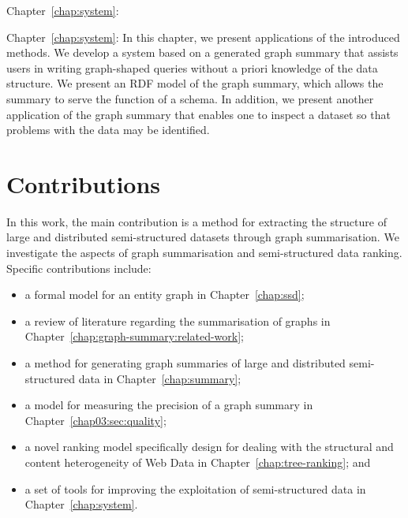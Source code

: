 
\begin{labeling}{Chapter~\ref{chap:system}:}
\item[Chapter~\ref{chap:system}:] In this chapter, we present applications of the introduced methods. We develop a system based on a generated graph summary that assists users in writing graph-shaped queries without a priori knowledge of the data structure. We present an RDF model of the graph summary, which allows the summary to serve the function of a schema. In addition, we present another application of the graph summary that enables one to inspect a dataset so that problems with the data may be identified.
\end{labeling}

\section{Contributions}

In this work, the main contribution is a method for extracting the structure of large and distributed semi-structured datasets through graph summarisation.
We investigate the aspects of graph summarisation and semi-structured data ranking. Specific contributions include:

\begin{itemize}
	\item a formal model for an entity graph in Chapter~\ref{chap:ssd};
	\item a review of literature regarding the summarisation of graphs in Chapter~\ref{chap:graph-summary:related-work};
	\item a method for generating graph summaries of large and distributed semi-structured data in Chapter~\ref{chap:summary};
	\item a model for measuring the precision of a graph summary in Chapter~\ref{chap03:sec:quality};
	\item a novel ranking model specifically design for dealing with the structural and content heterogeneity of Web Data in Chapter~\ref{chap:tree-ranking}; and
	\item a set of tools for improving the exploitation of semi-structured data in Chapter~\ref{chap:system}.
\end{itemize}
